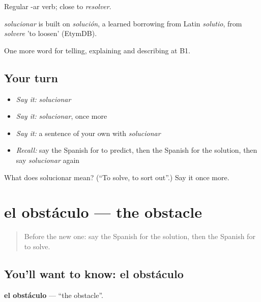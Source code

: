 Regular -ar verb; close to \emph{resolver}.

\begin{cousinweb}
\emph{solucionar} is built on \emph{solución}, a learned borrowing from Latin \emph{solutio}, from \emph{solvere} 'to loosen' (EtymDB).
\end{cousinweb}

\begin{grammarlens}[title={What you've built}]
One more word for telling, explaining and describing at B1.
\end{grammarlens}

\subsection*{Your turn}
\begin{itemize}
\raggedright
  \item \emph{Say it:} \emph{solucionar}
  \item \emph{Say it:} \emph{solucionar}, once more
  \item \emph{Say it:} a sentence of your own with \emph{solucionar}
  \item \emph{Recall:} say the Spanish for to predict, then the Spanish for the solution, then say \emph{solucionar} again
\end{itemize}

\begin{tcolorbox}[breakable,colback=teal!4,colframe=teal!35!black,title={Before you move on}]
What does solucionar mean? (\textquotedblleft{}To solve, to sort out\textquotedblright{}.) Say it once more.
\end{tcolorbox}
\section[el obstáculo]{el obstáculo — the obstacle}

\label{lesson:ES-C620-obstaculo}



\begin{quote}
Before the new one: say the Spanish for the solution, then the Spanish for to solve.
\end{quote}

\subsection*{You'll want to know: el obstáculo}
\textbf{el obstáculo} — \textquotedblleft{}the obstacle\textquotedblright{}.

